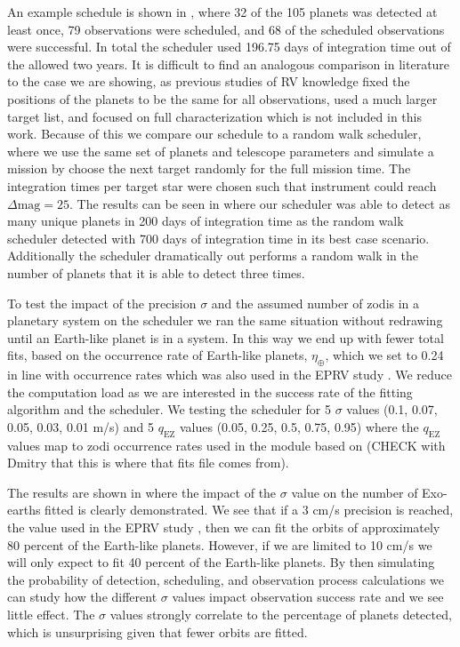An example schedule is shown in , where 32 of the 105
planets was detected at least once, 79 observations were scheduled, and 68 of
the scheduled observations were successful. In total the scheduler used 196.75
days of integration time out of the allowed two years. It is difficult to find
an analogous comparison in literature to the case we are showing, as previous
studies of RV knowledge fixed the positions of the planets to be the same for
all observations, used a much larger target list, and focused on full
characterization which is not included in this
work\citep{morganExplorationExpectedNumber2022a}. Because of this we compare
our schedule to a random walk scheduler, where we use the same set of planets
and telescope parameters and simulate a mission by choose the next target
randomly for the full mission time. The integration times per target star were
chosen such that instrument could reach $\Delta\textrm{mag}=25$. The results
can be seen in  where our scheduler was able to detect
as many unique planets in 200 days of integration time as the random walk
scheduler detected with 700 days of integration time in its best case scenario.
Additionally the scheduler dramatically out performs a random walk in the
number of planets that it is able to detect three times.

To test the impact of the precision $\sigma$ and the assumed number of zodis in
a planetary system on the scheduler we ran the same situation without redrawing
until an Earth-like planet is in a system. In this way we end up with fewer
total fits, based on the occurrence rate of Earth-like planets,
$\eta_{\oplus}$, which we set to 0.24 in line with
\citep{dulzJointRadialVelocity2020} occurrence rates which was also used in the
EPRV study \citet{morganExplorationExpectedNumber2022a}. We reduce the
computation load as we are interested in the success rate of the fitting
algorithm and the scheduler. We testing the scheduler for 5 $\sigma$ values
(0.1, 0.07, 0.05, 0.03, 0.01 m/s) and 5 $q_\textrm{EZ}$ values (0.05, 0.25,
0.5, 0.75, 0.95) where the $q_\textrm{EZ}$ values map to zodi occurrence rates
used in the  module  based on
\citet{mennessonCONSTRAININGEXOZODIACAL2014} (CHECK with Dmitry that this is where
that fits file comes from). 

The results are shown in  where the impact of
the $\sigma$ value on the number of Exo-earths fitted is clearly demonstrated.
We see that if a 3 cm/s precision is reached, the value used in the EPRV study
\citet{morganExplorationExpectedNumber2022a}, then we can fit the orbits of
approximately 80 percent of the Earth-like planets. However, if we are limited
to 10 cm/s we will only expect to fit 40 percent of the Earth-like planets. By
then simulating the probability of detection, scheduling, and observation
process calculations we can study how the different $\sigma$ values impact
observation success rate and we see little effect. The $\sigma$
values strongly correlate to the percentage of planets detected, which is unsurprising
given that fewer orbits are fitted.

